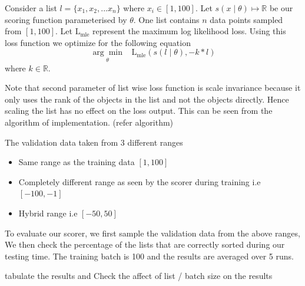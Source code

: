\documentclass[11pt]{report}
\begin{document}
Consider a list $l = \{x_1, x_2, ...x_n\}$ where $x_i \in [1, 100]$.
Let $s(x \mid \theta) \mapsto \mathbb{R}$ be our scoring function parameterised by $\theta$.
One list contains $n$ data points sampled from $[1, 100]$.
Let $\textrm{L}_{\textrm{mle}}$ represent the maximum log likelihood loss.
Using this loss function we optimize for the following equation
\begin{equation}
\underset{\theta}{\arg\min} \;\;\; \textrm{L}_{\textrm{mle}}(s(l \mid \theta),  - k * l)
\end{equation}
where $k \in \mathbb{R}$.
 
Note that second parameter of list wise loss function is scale invariance because it only uses the rank of the 
objects in the list and not the objects directly.
Hence scaling the list has no effect on the loss output.
This can be seen from the algorithm of implementation.  (refer algorithm)


The validation data taken from 3 different ranges
\begin{itemize}
\item Same range as the training data $[1, 100]$
\item Completely different range as seen by the scorer during training i.e $[-100, -1]$
\item Hybrid range i.e $[-50, 50]$
\end{itemize} 

To evaluate our scorer,  we first sample the validation data from the above ranges,
We then check the percentage of the lists that are correctly sorted during our testing time.
The training batch is 100 and the results are averaged over 5 runs.

tabulate the results and Check the affect of list / batch size on the results
\end{document}
